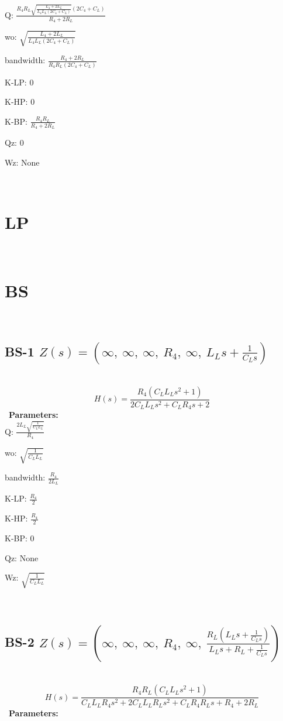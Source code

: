\documentclass{article}
\begin{document}
Q: $\frac{R_{4} R_{L} \sqrt{\frac{L_{4} + 2 L_{L}}{L_{4} L_{L} \left(2 C_{4} + C_{L}\right)}} \left(2 C_{4} + C_{L}\right)}{R_{4} + 2 R_{L}}$\ 

wo: $\sqrt{\frac{L_{4} + 2 L_{L}}{L_{4} L_{L} \left(2 C_{4} + C_{L}\right)}}$\ 

bandwidth: $\frac{R_{4} + 2 R_{L}}{R_{4} R_{L} \left(2 C_{4} + C_{L}\right)}$\ 

K-LP: $0$\ 

K-HP: $0$\ 

K-BP: $\frac{R_{4} R_{L}}{R_{4} + 2 R_{L}}$\ 

Qz: $0$\ 

Wz: $\text{None}$\ 

\ 

\section{LP}\ 
\section{BS}\ 
\subsection{BS-1 $Z(s) = \left( \infty, \  \infty, \  \infty, \  R_{4}, \  \infty, \  L_{L} s + \frac{1}{C_{L} s}\right)$ } \ 
\textbf{\[H(s) = \frac{R_{4} \left(C_{L} L_{L} s^{2} + 1\right)}{2 C_{L} L_{L} s^{2} + C_{L} R_{4} s + 2}\] } \ 
\textbf{Parameters:}\\ 

Q: $\frac{2 L_{L} \sqrt{\frac{1}{C_{L} L_{L}}}}{R_{4}}$\ 

wo: $\sqrt{\frac{1}{C_{L} L_{L}}}$\ 

bandwidth: $\frac{R_{4}}{2 L_{L}}$\ 

K-LP: $\frac{R_{4}}{2}$\ 

K-HP: $\frac{R_{4}}{2}$\ 

K-BP: $0$\ 

Qz: $\text{None}$\ 

Wz: $\sqrt{\frac{1}{C_{L} L_{L}}}$\ 

\ 

\subsection{BS-2 $Z(s) = \left( \infty, \  \infty, \  \infty, \  R_{4}, \  \infty, \  \frac{R_{L} \left(L_{L} s + \frac{1}{C_{L} s}\right)}{L_{L} s + R_{L} + \frac{1}{C_{L} s}}\right)$ } \ 
\textbf{\[H(s) = \frac{R_{4} R_{L} \left(C_{L} L_{L} s^{2} + 1\right)}{C_{L} L_{L} R_{4} s^{2} + 2 C_{L} L_{L} R_{L} s^{2} + C_{L} R_{4} R_{L} s + R_{4} + 2 R_{L}}\] } \ 
\textbf{Parameters:}\\ 
\end{document}
